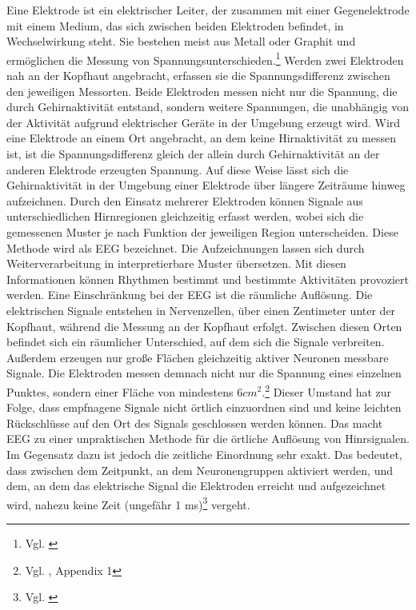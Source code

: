 Eine Elektrode ist ein elektrischer Leiter, der zusammen mit einer Gegenelektrode mit einem Medium, das sich zwischen beiden Elektroden befindet, in Wechselwirkung steht. Sie bestehen meist aus Metall oder Graphit und ermöglichen die Messung von Spannungsunterschieden.\footnote{Vgl. \cite{wiki_elektrode}} \newline
Werden zwei Elektroden nah an der Kopfhaut angebracht, erfassen sie die Spannungsdifferenz zwischen den jeweiligen Messorten. Beide Elektroden messen nicht nur die Spannung, die durch Gehirnaktivität entstand, sondern weitere Spannungen, die unabhängig von der Aktivität aufgrund elektrischer Geräte in der Umgebung erzeugt wird. Wird eine Elektrode an einem Ort angebracht, an dem keine Hirnaktivität zu messen ist, ist die Spannungsdifferenz gleich der allein durch Gehirnaktivität an der anderen Elektrode erzeugten Spannung.
Auf diese Weise lässt sich die Gehirnaktivität in der Umgebung einer Elektrode über längere Zeiträume hinweg aufzeichnen. Durch den Einsatz mehrerer Elektroden können Signale aus unterschiedlichen Hirnregionen gleichzeitig erfasst werden, wobei sich die gemessenen Muster je nach Funktion der jeweiligen Region unterscheiden. Diese Methode wird als EEG bezeichnet. Die Aufzeichnungen lassen sich durch Weiterverarbeitung in interpretierbare Muster übersetzen. Mit diesen Informationen können Rhythmen bestimmt und bestimmte Aktivitäten provoziert werden. \newline
Eine Einschränkung bei der EEG ist die räumliche Auflösung. Die elektrischen Signale entstehen in Nervenzellen, über einen Zentimeter unter der Kopfhaut, während die Messung an der Kopfhaut erfolgt. Zwischen diesen Orten befindet sich ein räumlicher Unterschied, auf dem sich die Signale verbreiten. Außerdem erzeugen nur große Flächen gleichzeitig aktiver Neuronen messbare Signale. Die Elektroden messen demnach nicht nur die Spannung eines einzelnen Punktes, sondern einer Fläche von mindestens $6 cm^2$.\footnote{Vgl. \cite{stlouis2016}, Appendix 1} Dieser Umstand hat zur Folge, dass empfnagene Signale nicht örtlich einzuordnen sind und keine leichten Rückschlüsse auf den Ort des Signals geschlossen werden können. Das macht EEG zu einer unpraktischen Methode für die örtliche Auflösung von Hinrsignalen. Im Gegensatz dazu ist jedoch die zeitliche Einordnung sehr exakt. Das bedeutet, dass zwischen dem Zeitpunkt, an dem Neuronengruppen aktiviert werden, und dem, an dem das elektrische Signal die Elektroden erreicht und aufgezeichnet wird, nahezu keine Zeit (ungefähr 1 ms)\footnote{Vgl. \cite{tu_darmstadt2022}} vergeht. 

